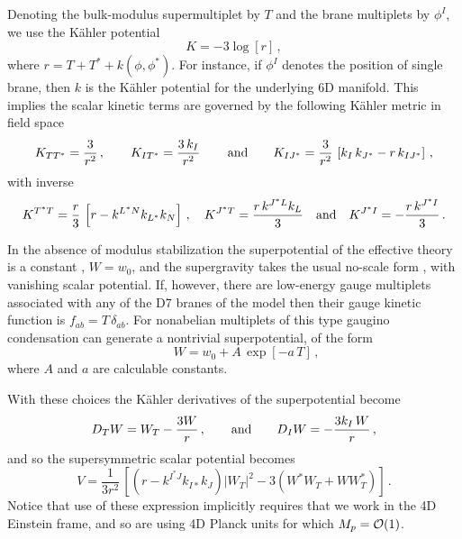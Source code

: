 \documentclass[12pt]{JHEP3}
\begin{document}
Denoting the bulk-modulus supermultiplet by $T$ and the brane
multiplets by $\phi^I$, we use the K\"ahler potential
\cite{truncation,kklt,kklmmt,louis}
%
\begin{equation}
    K = -3 \log \left[ r \right] \,,
\end{equation}
%
where $r = T + T^* + k(\phi,\phi^*)$. For instance, if $\phi^I$
denotes the position of single brane, then $k$ is the K\"ahler
potential for the underlying 6D manifold. This implies the scalar
kinetic terms are governed by the following K\"ahler metric in
field space
%
\begin{equation}
    K_{TT^*} = \frac{3}{r^2} \,, \qquad
    K_{IT^*} = \frac{3 \, k_I}{r^2} \, \qquad \hbox{and} \qquad
    K_{IJ^*} = \frac{3}{r^2} \, \left[ k_I \, k_{J^*} - r\, k_{IJ^*}
    \right] \,,
\end{equation}
%
with inverse
%
\begin{equation}
    K^{T^*T} = \frac{r}{3} \, \left[ r - k^{L^*N} k_{L^*} k_N \right]
    \,, \quad
    K^{J^*T} = \frac{r\, k^{J^*L} k_L }{3} \quad \hbox{and} \quad
    K^{J^*I} = - \frac{r\, k^{J^*I}}{3}  \,.
\end{equation}

In the absence of modulus stabilization the superpotential of the
effective theory is a constant \cite{gvw}, $W = w_0$, and the
supergravity takes the usual no-scale form \cite{noscale}, with
vanishing scalar potential. If, however, there are low-energy
gauge multiplets associated with any of the D7 branes of the model
then their gauge kinetic function is $f_{ab} = T \, \delta_{ab}$.
For nonabelian multiplets of this type gaugino condensation
\cite{gc,ourgc} can generate a nontrivial superpotential, of the
form
%
\begin{equation}
    \qquad W = w_0 + A \, \exp \left[ - a \, T \right] \,,
\end{equation}
%
where $A$ and $a$ are calculable constants.

With these choices the K\"ahler derivatives of the superpotential
become
%
\begin{equation}
    D_T W = W_T - \frac{3 W}{r} \,, \qquad \hbox{and} \qquad
    D_I W = - \frac{3 k_I \, W}{r} \,,
\end{equation}
%
and so the supersymmetric scalar potential \cite{cremmeretal}
becomes
%
\begin{equation}
    V = \frac{1}{3r^2} \, \left[ \left(r - k^{I^*J} k_{I*} k_J
    \right) |W_T|^2 - 3 (W^* W_T + W W_T^*) \right] \,.
\end{equation}
%
Notice that use of these expression implicitly requires that we
work in the 4D Einstein frame, and so are using 4D Planck units
for which $M_p = {\cal O}(1)$.
\end{document}

